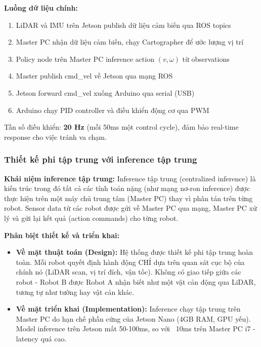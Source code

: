 \textbf{Luồng dữ liệu chính:}
\begin{enumerate}[nosep]
\item LiDAR và IMU trên Jetson publish dữ liệu cảm biến qua ROS topics
\item Master PC nhận dữ liệu cảm biến, chạy Cartographer để ước lượng vị trí
\item Policy node trên Master PC inference action $(v, \omega)$ từ observations
\item Master publish cmd\_vel về Jetson qua mạng ROS
\item Jetson forward cmd\_vel xuống Arduino qua serial (USB)
\item Arduino chạy PID controller và điều khiển động cơ qua PWM
\end{enumerate}

Tần số điều khiển: \textbf{20 Hz} (mỗi 50ms một control cycle), đảm bảo real-time response cho việc tránh va chạm.

\subsubsection{Thiết kế phi tập trung với inference tập trung}
\label{subsec:decentralized_design}

\textbf{Khái niệm inference tập trung:} Inference tập trung (centralized inference) là kiến trúc trong đó tất cả các tính toán nặng (như mạng nơ-ron inference) được thực hiện trên một máy chủ trung tâm (Master PC) thay vì phân tán trên từng robot. Sensor data từ các robot được gửi về Master PC qua mạng, Master PC xử lý và gửi lại kết quả (action commands) cho từng robot.

\textbf{Phân biệt thiết kế và triển khai:}

\begin{itemize}[nosep] 
\item \textbf{Về mặt thuật toán (Design):} Hệ thống được thiết kế phi tập trung hoàn toàn. Mỗi robot quyết định hành động CHỈ dựa trên quan sát cục bộ của chính nó (LiDAR scan, vị trí đích, vận tốc). Không có giao tiếp giữa các robot - Robot B được Robot A nhận biết như một vật cản động qua LiDAR, tương tự như tường hay vật cản khác.

\item \textbf{Về mặt triển khai (Implementation):} Inference chạy tập trung trên Master PC do hạn chế phần cứng của Jetson Nano (4GB RAM, GPU yếu). Model inference trên Jetson mất 50-100ms, so với ~10ms trên Master PC i7 - latency quá cao.
\end{itemize}

